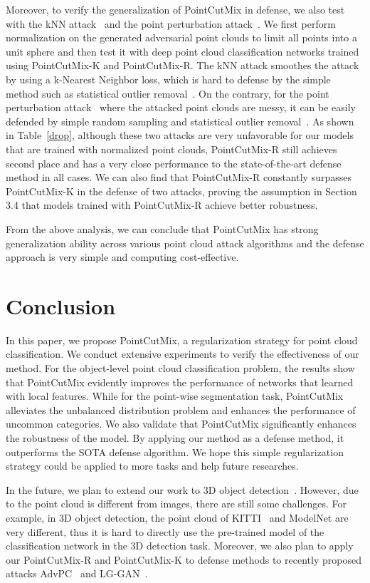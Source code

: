 \documentclass{article}
\begin{document}
Moreover, to verify the generalization of PointCutMix in defense, we also test with the kNN attack~\cite{knnattack} and the point perturbation attack~\cite{generatingadpoint}.
We first perform normalization on the generated adversarial point clouds to limit all points into a unit sphere and then test it with deep point cloud classification networks trained using PointCutMix-K and PointCutMix-R. 
The kNN attack smoothes the attack by using a k-Nearest Neighbor loss, which is hard to defense by the simple method such as statistical outlier removal~\cite{dupnet}. On the contrary, for the point perturbation attack~\cite{generatingadpoint} where the attacked point clouds are messy, it can be easily defended by simple random sampling and statistical outlier removal~\cite{dupnet}. 
As shown in Table~\ref{drop}, although these two attacks are very unfavorable for our models that are trained with normalized point clouds, PointCutMix-R still achieves second place and has a very close performance to the state-of-the-art defense method in all cases.
We can also find that PointCutMix-R constantly surpasses PointCutMix-K in the defense of two attacks, proving the assumption in Section 3.4 that models trained with PointCutMix-R achieve better robustness.

From the above analysis, we can conclude that PointCutMix has strong generalization ability across various point cloud attack algorithms and the defense approach is very simple and computing cost-effective.



\section{Conclusion}

In this paper, we propose PointCutMix, a regularization strategy for point cloud classification. We conduct extensive experiments to verify the effectiveness of our method. For the object-level point cloud classification problem, the results show that PointCutMix evidently improves the performance of networks that learned with local features. While for the point-wise segmentation task, PointCutMix alleviates the unbalanced distribution problem and enhances the performance of uncommon categories. We also validate that PointCutMix significantly enhances the robustness of the model. By applying our method as a defense method, it outperforms the SOTA defense algorithm. We hope this simple regularization strategy could be applied to more tasks and help future researches.

In the future, we plan to extend our work to 3D object detection~\cite{pvrcnn}. However, due to the point cloud is different from images, there are still some challenges. For example, in 3D object detection, the point cloud of KITTI~\cite{kitti} and ModelNet are very different, thus it is hard to directly use the pre-trained model of the classification network in the 3D detection task. Moreover, we also plan to apply our PointCutMix-R and PointCutMix-K to defense methods to recently proposed attacks AdvPC~\cite{advpc} and LG-GAN~\cite{lggan}.








\end{document}
